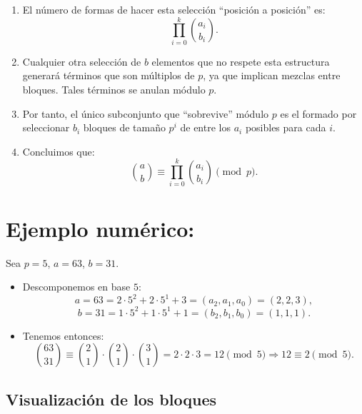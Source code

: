 \begin{itemize}
\begin{enumerate}[label=\textbf{\arabic*.}]
        \item El número de formas de hacer esta selección ``posición a posición'' es:
    \[
        \prod_{i=0}^k \binom{a_i}{b_i}.
    \]
    
        \item Cualquier otra selección de $b$ elementos que no respete esta estructura generará términos que son múltiplos de $p$, ya que implican mezclas entre bloques. Tales términos se anulan módulo $p$.
    
        \item Por tanto, el único subconjunto que ``sobrevive'' módulo $p$ es el formado por seleccionar $b_i$ bloques de tamaño $p^i$ de entre los $a_i$ posibles para cada $i$.
    
        \item Concluimos que:
    \[
        \binom{a}{b} \equiv \prod_{i=0}^{k} \binom{a_i}{b_i} \pmod{p}.
    \]
    \end{enumerate}
    \section*{Ejemplo numérico:}
    Sea $p = 5$, $a = 63$, $b = 31$.
    
    \begin{itemize}
        \item Descomponemos en base $5$:
    \[
        a = 63 = 2 \cdot 5^2 + 2 \cdot 5^1 + 3 = (a_2, a_1, a_0) = (2,2,3),
    \]
    \[
        b = 31 = 1 \cdot 5^2 + 1 \cdot 5^1 + 1 = (b_2, b_1, b_0) = (1,1,1).
    \]
        \item Tenemos entonces:
    \[
        \binom{63}{31} \equiv \binom{2}{1} \cdot \binom{2}{1} \cdot \binom{3}{1} = 2 \cdot 2 \cdot 3 = 12 \pmod{5} \Rightarrow \boxed{12 \equiv 2 \pmod{5}}.
    \]
    \end{itemize}
    
    \subsection*{Visualización de los bloques}
    
    \begin{center}
\end{center}
\end{itemize}
